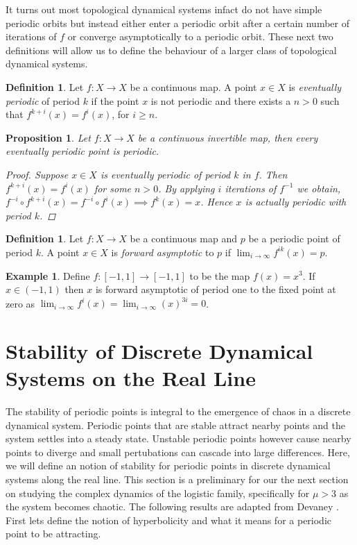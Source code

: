 \documentclass[11pt,a4paper,oneside]{memoir}
\theoremstyle{plain}
\newtheorem{prop}[thm]{Proposition}
\theoremstyle{definition}
\newtheorem{defn}[thm]{Definition}
\newtheorem{exmp}[thm]{Example}
\begin{document}
It turns out most topological dynamical systems infact do not have simple periodic orbits but instead either enter a periodic orbit after a certain number of iterations of $f$ or converge asymptotically to a periodic orbit. These next two definitions will allow us to define the behaviour of a larger class of topological dynamical systems.

\begin{defn}
    Let $f: X \to X$ be a continuous map. A point $x \in X$ is \emph{eventually periodic} of period $k$ if the point $x$ is not periodic and there exists a $n > 0$ such that $f^{k+i}(x) = f^i(x)$, for $i \geq n$.
\end{defn}

\begin{prop}
    Let $f: X \to X$ be a continuous invertible map, then every eventually periodic point is periodic.
    \begin{proof}
        Suppose $x \in X$ is eventually periodic of period $k$ in $f$. Then $f^{k + i}(x) = f^i(x)$ for some $n > 0$. By applying $i$ iterations of $f^{-1}$ we obtain, $f^{-i} \circ f^{k + i}(x) = f^{-i} \circ f^{i}(x) \implies f^k(x) = x$. Hence $x$ is actually periodic with period $k$.
    \end{proof}
\end{prop}

\begin{defn}
    Let $f: X \to X$ be a continuous map and $p$ be a periodic point of period $k$. A point $x \in X$ is \emph{forward asymptotic} to $p$ if $\lim_{i \to \infty} f^{ik}(x) = p$.
\end{defn}

\begin{exmp}
    Define $f: [-1, 1] \to [-1, 1]$ to be the map $f(x) = x^3$. If $x \in (-1, 1)$ then $x$ is forward asymptotic of period one to the fixed point at zero as $\lim_{i \to \infty} f^{i} \left(x\right)  = \lim_{i \to \infty} \left(x\right) ^{3i} = 0$.
\end{exmp}

\section{Stability of Discrete Dynamical Systems on the Real Line}
The stability of periodic points is integral to the emergence of chaos in a discrete dynamical system. Periodic points that are stable attract nearby points and the system settles into a steady state. Unstable periodic points however cause nearby points to diverge and small pertubations can cascade into large differences. Here, we will define an notion of stability for periodic points in discrete dynamical systems along the real line. This section is a preliminary for our the next section on studying the complex dynamics of the logistic family, specifically for $\mu > 3$ as the system becomes chaotic. The following results are adapted from Devaney \cite[Section 1.4]{devaney}. First lets define the notion of hyperbolicity and what it means for a periodic point to be attracting.
\end{document}
